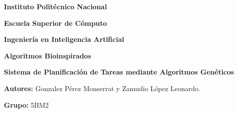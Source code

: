 \documentclass[11pt,a4paper]{article}
\begin{document}
\begin{center}
    \vspace*{-1cm}
    {\LARGE \textbf{Instituto Politécnico Nacional}}\par
    \vspace{0.5em}
    {\Large \textbf{Escuela Superior de Cómputo}}\par
    \vspace{0.5em}
    {\Large \textbf{Ingeniería en Inteligencia Artificial}}\par
    \vspace{0.5em}
    {\Large \textbf{Algoritmos Bioinspirados}}\par
    \vspace{2em}
    {\large \textbf{Sistema de Planificación de Tareas mediante Algoritmos Genéticos}}\par
    \vspace{2em}
    {\large \textbf{Autores:} Gonzalez Pérez Monserrat y Zamudio López Leonardo.}\par
    \vspace{0.4em}
    {\large \textbf{Grupo:} 5BM2}\par
\end{center}

\vspace{1.5em}
\tableofcontents
\clearpage


\begin{abstract}
Este trabajo presenta el marco teórico y técnico de un sistema para la resolución del problema de planificación de tareas mediante algoritmos genéticos. El problema se modela como una instancia del Job Shop Scheduling Problem, donde cada trabajo está compuesto por operaciones con precedencias internas y recursos compartidos. El objetivo del sistema es minimizar el tiempo total de ejecución, medido mediante el makespan, bajo restricciones de precedencia y disponibilidad de máquinas. Para ello, se propone un algoritmo evolutivo que codifica soluciones como permutaciones de operaciones, evalúa su calidad mediante una función objetivo y aplica operadores de selección, cruce y mutación para mejorar iterativamente la población. La arquitectura del sistema está organizada en frontend, backend REST y capa de cómputo asíncrono con Celery, apoyada en MongoDB y Redis. El documento presenta la formalización matemática del problema, la lógica de decodificación de una solución, la estructura del algoritmo genético y el flujo de ejecución del sistema desarrollado.
\end{abstract}
\end{document}
